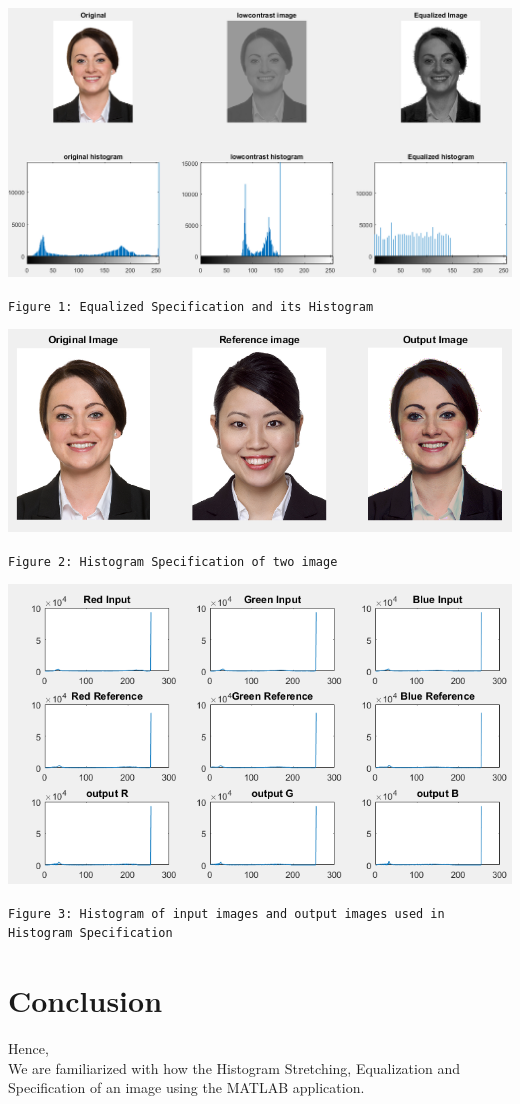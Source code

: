 \documentclass[12pt]{article}
\begin{document}
\includegraphics[scale = 0.6]{output_labfive_1.png}\\
{\centering
\texttt{Figure 1:  Equalized Specification and its Histogram}\par}
\includegraphics[scale = 0.6]{output_labfive_2.png}\\
{\centering
\texttt{Figure 2:  Histogram Specification of two image}\par}
\includegraphics[scale = 0.6]{output_labfive_3.png}\\
{\centering
\texttt{Figure 3:  Histogram of  input images and output images used in Histogram Specification}\par}
\pagebreak
\section{Conclusion}
Hence, \\
We are familiarized with how the Histogram Stretching, Equalization and Specification of an image using the MATLAB application.
\end{document}
